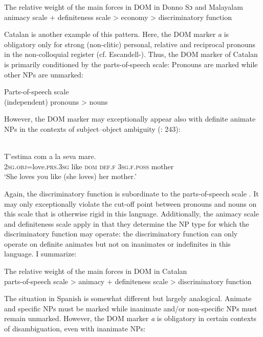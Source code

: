 \documentclass[output=paper]{langsci/langscibook}
\begin{document}
\ea\label{ex:serzant:12}
The relative weight of the main forces in DOM in Donno Sɔ and Malayalam\\
animacy scale + definiteness scale > economy > discriminatory function\\
\z

Catalan is another example of this pattern. Here, the DOM marker \textit{a} is obligatory only for strong (non-clitic) personal, relative and reciprocal pronouns in the non-colloquial register (cf. Escandell-\citealt{Vidal2009}). Thus, the DOM marker of Catalan is primarily conditioned by the parts-of-speech scale: Pronouns are marked while other NPs are unmarked: 

\ea\label{ex:serzant:13}
Parts-of-speech scale\\
(independent) pronouns > nouns\\
\z

However, the DOM marker may exceptionally appear also with definite animate NPs in the contexts of subject–object ambiguity (\citealt{WheelerEtAl1999}: 243):

\ea\label{ex:serzant:}
\\
\gll T’estima     com a     la   seva     mare.\\
     \textsc{2sg.obj}=love.\textsc{prs.3sg} like \textsc{dom}   \textsc{def.f}   \textsc{3sg.f.poss}   mother\\
\glt ‘She loves you like (she loves) her mother.’
\z

Again, the discriminatory function is subordinate to the parts-of-speech scale . It may only exceptionally violate the cut-off point between pronouns and nouns on this scale that is otherwise rigid in this language. Additionally, the animacy scale  and definiteness scale  apply in that they determine the NP type for which the discriminatory function may operate: the discriminatory function can only operate on definite animates but not on inanimates or indefinites in this language. I summarize:

\ea\label{ex:serzant:15}
The relative weight of the main forces in DOM in Catalan\\
parts-of-speech scale > animacy + definiteness scale > discriminatory function
\z

The situation in Spanish is somewhat different but largely analogical. Animate and specific NPs must be marked while inanimate and/or non-specific NPs must remain unmarked. However, the DOM marker \textit{a} is obligatory in certain contexts of disambiguation, even with inanimate NPs:
\end{document}
